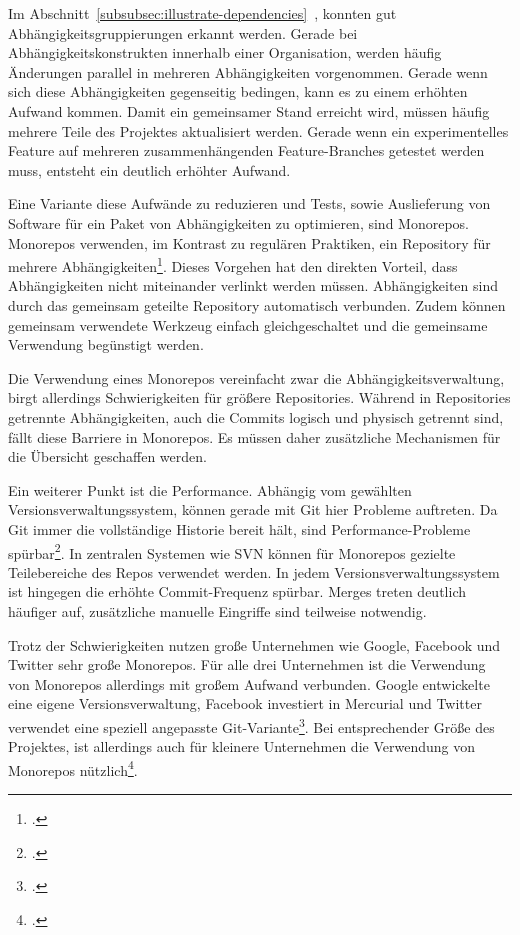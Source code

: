 Im Abschnitt~\ref{subsubsec:illustrate-dependencies}~\glqq {}\grqq{}, konnten gut Abhängigkeitsgruppierungen erkannt werden. Gerade bei Abhängigkeitskonstrukten innerhalb einer Organisation, werden häufig Änderungen parallel in mehreren Abhängigkeiten vorgenommen. Gerade wenn sich diese Abhängigkeiten gegenseitig bedingen, kann es zu einem erhöhten Aufwand kommen. Damit ein gemeinsamer Stand erreicht wird, müssen häufig mehrere Teile des Projektes aktualisiert werden. Gerade wenn ein experimentelles Feature auf mehreren zusammenhängenden Feature-Branches getestet werden muss, entsteht ein deutlich erhöhter Aufwand.

Eine Variante diese Aufwände zu reduzieren und Tests, sowie Auslieferung von Software für ein Paket von Abhängigkeiten zu optimieren, sind Monorepos. Monorepos verwenden, im Kontrast zu regulären Praktiken, ein Repository für mehrere Abhängigkeiten\footcite{trunkbaseddevelopment-monorepo}. Dieses Vorgehen hat den direkten Vorteil, dass Abhängigkeiten nicht miteinander verlinkt werden müssen. Abhängigkeiten sind durch das gemeinsam geteilte Repository automatisch verbunden. Zudem können gemeinsam verwendete Werkzeug einfach gleichgeschaltet und die gemeinsame Verwendung begünstigt werden.

Die Verwendung eines Monorepos vereinfacht zwar die Abhängigkeitsverwaltung, birgt allerdings Schwierigkeiten für größere Repositories. Während in Repositories getrennte Abhängigkeiten, auch die Commits logisch und physisch getrennt sind, fällt diese Barriere in Monorepos. Es müssen daher zusätzliche Mechanismen für die Übersicht geschaffen werden.

Ein weiterer Punkt ist die Performance. Abhängig vom gewählten Versionsverwaltungssystem, können gerade mit Git hier Probleme auftreten. Da Git immer die vollständige Historie bereit hält, sind Performance-Probleme spürbar\footcite{atlassian-monorepo-git}. In zentralen Systemen wie SVN können für Monorepos gezielte Teilebereiche des Repos verwendet werden. 
In jedem Versionsverwaltungssystem ist hingegen die erhöhte Commit-Frequenz spürbar. Merges treten deutlich häufiger auf, zusätzliche manuelle Eingriffe sind teilweise notwendig.

Trotz der Schwierigkeiten nutzen große Unternehmen wie Google, Facebook und Twitter sehr große Monorepos. Für alle drei Unternehmen ist die Verwendung von Monorepos allerdings mit großem Aufwand verbunden. Google entwickelte eine eigene Versionsverwaltung, Facebook investiert in Mercurial und Twitter verwendet eine speziell angepasste Git-Variante\footcite{monorepos-wild}.
Bei entsprechender Größe des Projektes, ist allerdings auch für kleinere Unternehmen die Verwendung von Monorepos nützlich\footcite{hackernoon-positive-monorepo}.

